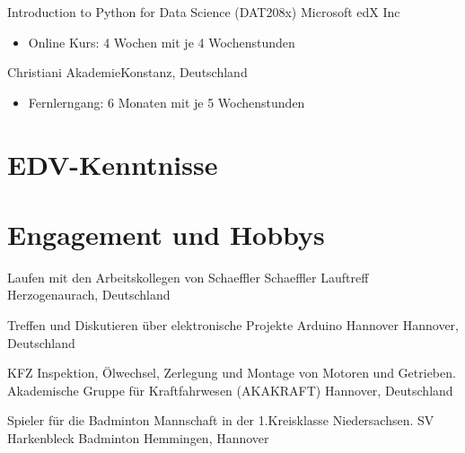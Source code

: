 \documentclass[11pt,a4paper,sans]{moderncv}
\begin{document}
{Introduction to Python for Data Science (DAT208x)}
{Microsoft}
{edX Inc}
{}
{
    \begin{itemize}
        \item Online Kurs: 4 Wochen mit je 4 Wochenstunden
    \end{itemize}
}

{Christiani Akademie}{Konstanz, Deutschland}{}{
  \begin{itemize}
    \item Fernlerngang: 6 Monaten mit je 5 Wochenstunden
  \end{itemize}
}

\section{\textbf{EDV-Kenntnisse}}






\section{\textbf{Engagement und Hobbys}}

{
Laufen mit den Arbeitskollegen von Schaeffler
}
{Schaeffler Lauftreff}
{Herzogenaurach, Deutschland}
{}
{}

{
Treffen und Diskutieren über elektronische Projekte
}
{Arduino Hannover}
{Hannover, Deutschland}
{}
{}

{
KFZ Inspektion, Ölwechsel, Zerlegung und Montage von Motoren und Getrieben.
}
{Akademische Gruppe für Kraftfahrwesen (AKAKRAFT)}
{Hannover, Deutschland}
{}
{}

{
 Spieler für die Badminton Mannschaft in der 1.Kreisklasse Niedersachsen.
}
{SV Harkenbleck Badminton}
{Hemmingen, Hannover}
{}
{}
\end{document}
